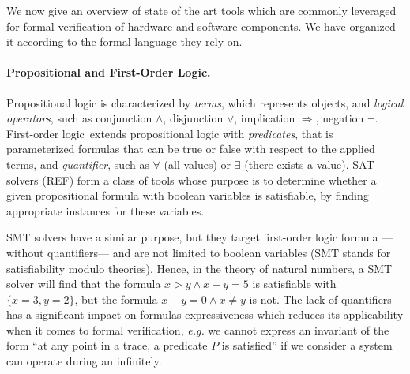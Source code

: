 We now give an overview of state of the art tools which are commonly leveraged
for formal verification of hardware and software components.
%
We have organized it according to the formal language they rely on.

\paragraph{Propositional and First-Order Logic.}
%
Propositional logic is characterized by \emph{terms}, which represents objects,
and \emph{logical operators}, such as conjunction \( \wedge \), disjunction
\( \vee \), implication \( \Rightarrow \), negation \( \neg \).
%
First-order logic\,\cite{smullyan2012fol} extends propositional logic with
\emph{predicates}, that is parameterized formulas that can be true or false with
respect to the applied terms, and \emph{quantifier}, such as \( \forall \) (all
values) or \( \exists \) (there exists a value).
%
SAT solvers (REF) form a class of tools whose purpose is to determine whether a
given propositional formula with boolean variables is satisfiable, by finding
appropriate instances for these variables.

SMT solvers have a similar purpose, but they target first-order logic formula
---without quantifiers--- and are not limited to boolean variables (SMT stands
for satisfiability modulo theories).
%
Hence, in the theory of natural numbers, a SMT solver will find that the formula
\( x > y \wedge x + y = 5 \) is satisfiable with \( \{ x = 3, y = 2 \} \), but
the formula \( x - y = 0 \wedge x \neq y \) is not.
%
The lack of quantifiers has a significant impact on formulas expressiveness
which reduces its applicability when it comes to formal verification,
\emph{e.g.} we cannot express an invariant of the form ``at any point in a
trace, a predicate \( P \) is satisfied'' if we consider a system can operate
during an infinitely.


